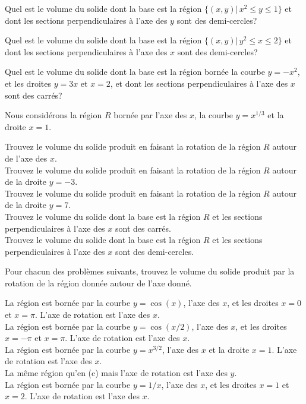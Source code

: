 \begin{question}[\eng]
 Quel est le volume du solide dont la base est la région
$\displaystyle \{(x,y) | \, x^2 \leq y \leq 1\}$ et dont les sections
perpendiculaires à l'axe des $y$ sont des demi-cercles?

 Quel est le volume du solide dont la base est la région
$\displaystyle \{(x,y) | \, y^2 \leq x \leq 2\}$ et dont les sections
perpendiculaires à l'axe des $x$ sont des demi-cercles?

 Quel est le volume du solide dont la base est la région
bornée la courbe $y=-x^2$, et les droites $y=3x$ et $x=2$, et 
dont les sections perpendiculaires à l'axe des $x$ sont des carrés?
\label{8Q13}
\end{question}

\begin{question}[\eng]
Nous considérons la région $R$ bornée par l'axe des $x$, la courbe
$y = x^{1/3}$ et la droite $x = 1$.

 Trouvez le volume du solide produit en faisant la rotation de
la région $R$ autour de l'axe des $x$. \\
 Trouvez le volume du solide produit en faisant la rotation de la
région $R$ autour de la droite $y = -3$. \\
 Trouvez le volume du solide produit en faisant la rotation de la
région $R$ autour de la droite $y = 7$. \\
 Trouvez le volume du solide dont la base est la région $R$ et
les sections perpendiculaires à l'axe des $x$ sont des carrés. \\
 Trouvez le volume du solide dont la base est la région $R$ et
les sections perpendiculaires à l'axe des $x$ sont des demi-cercles.
\label{8Q14}
\end{question}

\begin{question}[\eng]
Pour chacun des problèmes suivants, trouvez le volume du solide
produit par la rotation de la région donnée autour de l'axe donné.

 La région est bornée par la courbe $y=\cos(x)$, l'axe des
$x$, et les droites $x=0$ et $x=\pi$.  L'axe de rotation est l'axe des
$x$.\\
 La région est bornée par la courbe $y=\cos(x/2)$, l'axe des
$x$, et les droites $x=-\pi$ et $x=\pi$.  L'axe de rotation est l'axe
des $x$.\\
 La région est bornée par la courbe $y=x^{3/2}$, l'axe des $x$
et la droite $x=1$.  L'axe de rotation est l'axe des $x$.\\
 La même région qu'en (c) mais l'axe de rotation est
l'axe des $y$.\\
 La région est bornée par la courbe $y=1/x$, l'axe des $x$, et
les droites $x=1$ et $x=2$.  L'axe de rotation est l'axe des $x$.
\label{8Q15}
\end{question}


